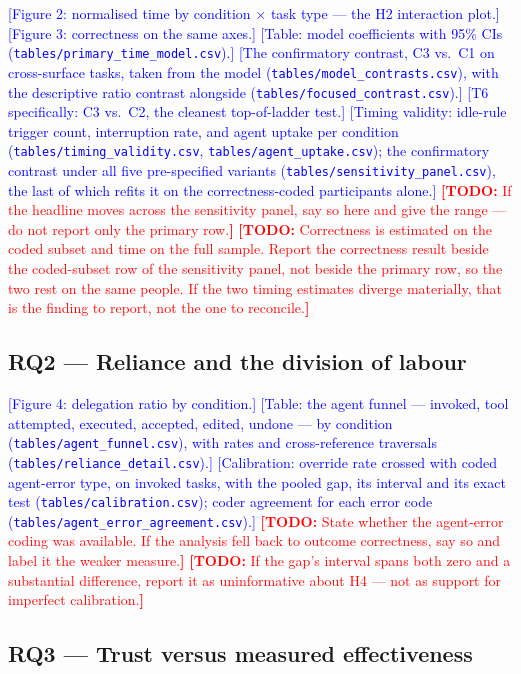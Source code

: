 \documentclass[acmsmall,review,screen]{acmart}
\newcommand{\todo}[1]{\textcolor{red}{\textbf{[TODO:} #1\textbf{]}}}
\newcommand{\NUM}[1]{\textcolor{blue}{[#1]}}          %
\newcommand{\code}[1]{\texttt{#1}}
\begin{document}
\NUM{Figure 2: normalised time by condition $\times$ task type --- the H2
interaction plot.}
\NUM{Figure 3: correctness on the same axes.}
\NUM{Table: model coefficients with 95\% CIs
(\code{tables/primary\_time\_model.csv}).}
\NUM{The confirmatory contrast, C3 vs.\ C1 on cross-surface tasks, taken from the
model (\code{tables/model\_contrasts.csv}), with the descriptive ratio contrast
alongside (\code{tables/focused\_contrast.csv}).}
\NUM{T6 specifically: C3 vs.\ C2, the cleanest top-of-ladder test.}
\NUM{Timing validity: idle-rule trigger count, interruption rate, and agent
uptake per condition (\code{tables/timing\_validity.csv},
\code{tables/agent\_uptake.csv}); the confirmatory contrast under all five
pre-specified variants (\code{tables/sensitivity\_panel.csv}), the last of which
refits it on the correctness-coded participants alone.}
\todo{If the headline moves across the sensitivity panel, say so here and give
the range --- do not report only the primary row.}
\todo{Correctness is estimated on the coded subset and time on the full sample.
Report the correctness result beside the coded-subset row of the sensitivity
panel, not beside the primary row, so the two rest on the same people. If the
two timing estimates diverge materially, that is the finding to report, not the
one to reconcile.}

\subsection{RQ2 --- Reliance and the division of labour}

\NUM{Figure 4: delegation ratio by condition.}
\NUM{Table: the agent funnel --- invoked, tool attempted, executed, accepted,
edited, undone --- by condition (\code{tables/agent\_funnel.csv}), with rates and
cross-reference traversals (\code{tables/reliance\_detail.csv}).}
\NUM{Calibration: override rate crossed with coded agent-error type, on invoked
tasks, with the pooled gap, its interval and its exact test
(\code{tables/calibration.csv}); coder agreement for each error code
(\code{tables/agent\_error\_agreement.csv}).}
\todo{State whether the agent-error coding was available. If the analysis fell
back to outcome correctness, say so and label it the weaker measure.}
\todo{If the gap's interval spans both zero and a substantial difference, report
it as uninformative about H4 --- not as support for imperfect calibration.}

\subsection{RQ3 --- Trust versus measured effectiveness}
\end{document}
